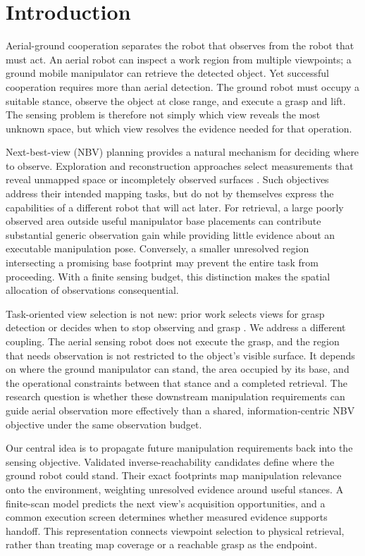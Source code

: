 \section{Introduction}
\label{sec:introduction}
Aerial-ground cooperation separates the robot that observes from the robot
that must act. An aerial robot can inspect a work region from multiple viewpoints;
a ground mobile manipulator can retrieve the detected object. Yet successful
cooperation requires more than aerial detection. The ground robot must occupy
a suitable stance, observe the object at close range, and execute a grasp and
lift. The sensing problem is therefore not simply which view reveals the most
unknown space, but which view resolves the evidence needed for that operation.

Next-best-view (NBV) planning provides a natural mechanism for deciding where
to observe. Exploration and reconstruction approaches select measurements that
reveal unmapped space or incompletely observed surfaces
\cite{bircher2016nbv,border2018see}. Such objectives address their intended
mapping tasks, but do not by themselves express the capabilities of a different
robot that will act later. For retrieval, a large poorly observed area outside
useful manipulator base placements can contribute substantial generic observation
gain while providing little evidence about an executable manipulation pose.
Conversely, a smaller unresolved region intersecting a promising base footprint
may prevent the entire task from proceeding. With a finite sensing budget, this
distinction makes the spatial allocation of observations consequential.

Task-oriented view selection is not new: prior work selects views for grasp
detection or decides when to stop observing and grasp
\cite{gualtieri2017viewpoint,breyer2022target}. We address a different coupling.
The aerial sensing robot does not execute the grasp, and the region that needs
observation is not restricted to the object's visible surface. It depends on
where the ground manipulator can stand, the area occupied by its base, and the
operational constraints between that stance and a completed retrieval. The
research question is whether these downstream manipulation requirements can
guide aerial observation more effectively than a shared, information-centric
NBV objective under the same observation budget.

Our central idea is to propagate future manipulation requirements back into
the sensing objective. Validated inverse-reachability candidates define where
the ground robot could stand. Their exact footprints map manipulation relevance
onto the environment, weighting unresolved evidence around useful stances.
A finite-scan model predicts the next view's acquisition opportunities, and a
common execution screen determines whether measured evidence supports handoff.
This representation connects viewpoint selection to physical retrieval, rather
than treating map coverage or a reachable grasp as the endpoint.

